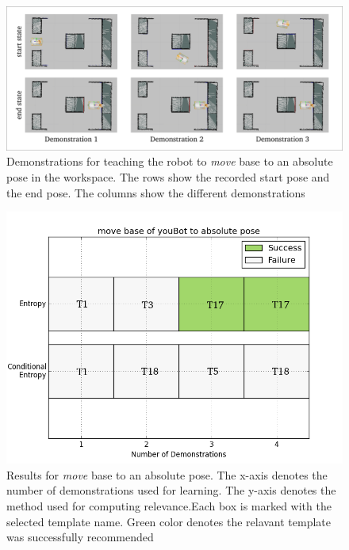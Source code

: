 \begin{figure}[htp]
\centering
\includegraphics[scale=0.3]{images/base_absolute_exp.png}
\caption[Demonstrations to teach the youBot to move base to an absolute location]
{Demonstrations for teaching the robot to \textit{move} base
to an absolute pose in the workspace. The rows show the recorded start pose and the end pose. The 
columns show the different demonstrations}
\label{base absolute exp}
\end{figure}
\begin{figure}[htp]
\centering
\includegraphics[scale=0.5]{images/base_absolute_result.png}
\caption[Result : \textit{move} base absolute pose]{Results for \textit{ move}
base to an absolute pose. The x-axis denotes the number of demonstrations used
for learning. The y-axis denotes the method used for computing relevance.Each
box is marked with the selected template name. Green
color denotes the relavant template was successfully recommended}
\label{base absolute result}
\end{figure}



